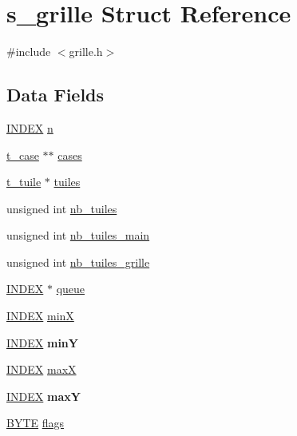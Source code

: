 \hypertarget{structs__grille}{}\section{s\+\_\+grille Struct Reference}
\label{structs__grille}


{\ttfamily \#include $<$grille.\+h$>$}

\subsection*{Data Fields}
\begin{DoxyCompactItemize}
\item 
\hyperlink{types_8h_ac6885dbfb371c33e523c7fb046118b36}{I\+N\+D\+EX} \hyperlink{structs__grille_a09b07d21d4a001c90c4f4f8025ac3965}{n}
\item 
\hyperlink{structs__case}{t\+\_\+case} $\ast$$\ast$ \hyperlink{structs__grille_a0c83208ed3489d20fb32a4bd8269328e}{cases}
\item 
\hyperlink{structs__tuile}{t\+\_\+tuile} $\ast$ \hyperlink{structs__grille_a80d9aee68750a4c4c5cae8185c74b7b1}{tuiles}
\item 
unsigned int \hyperlink{structs__grille_a0f709b2f457ab146ea70a4a733d5a69d}{nb\+\_\+tuiles}
\item 
unsigned int \hyperlink{structs__grille_ae2c7873819c9dc229c5528c208bd0d30}{nb\+\_\+tuiles\+\_\+main}
\item 
unsigned int \hyperlink{structs__grille_a5d8aed076ffe76bf0d7086d229d4ab24}{nb\+\_\+tuiles\+\_\+grille}
\item 
\hyperlink{types_8h_ac6885dbfb371c33e523c7fb046118b36}{I\+N\+D\+EX} $\ast$ \hyperlink{structs__grille_afa494c65bda9a2ab166fcf495911f919}{queue}
\item 
\hyperlink{types_8h_ac6885dbfb371c33e523c7fb046118b36}{I\+N\+D\+EX} \hyperlink{structs__grille_adc46f40aa2b1eb2bf96885c55b497f4e}{minX}
\item 
\hyperlink{types_8h_ac6885dbfb371c33e523c7fb046118b36}{I\+N\+D\+EX} {\bfseries minY}\hypertarget{structs__grille_ae2f33801d59bf0d79279f661bf0dff7b}{}\label{structs__grille_ae2f33801d59bf0d79279f661bf0dff7b}

\item 
\hyperlink{types_8h_ac6885dbfb371c33e523c7fb046118b36}{I\+N\+D\+EX} \hyperlink{structs__grille_a08e437d260f36932a3f1514d778a401a}{maxX}
\item 
\hyperlink{types_8h_ac6885dbfb371c33e523c7fb046118b36}{I\+N\+D\+EX} {\bfseries maxY}\hypertarget{structs__grille_af2693646d5b9069e09e3ead3dc9d947b}{}\label{structs__grille_af2693646d5b9069e09e3ead3dc9d947b}

\item 
\hyperlink{types_8h_aec93e83855ac17c3c25c55c37ca186dd}{B\+Y\+TE} \hyperlink{structs__grille_aea8fdcb6be083042616784eaa97b45be}{flags}
\end{DoxyCompactItemize}


